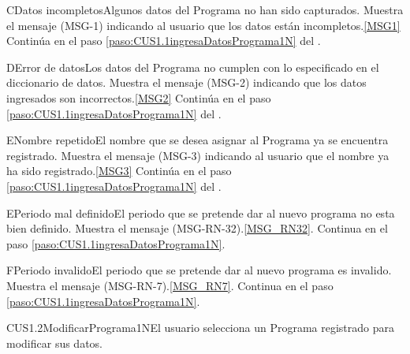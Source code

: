 	\begin{UCtrayectoriaA}{C}{Datos incompletos}{Algunos datos del Programa no han sido capturados.}
			\UCpaso Muestra el mensaje (MSG-1) indicando al usuario que los datos est\'an incompletos.\ref{MSG1}
			\UCpaso Contin\'ua en el paso \ref{paso:CUS1.1ingresaDatosPrograma1N} del .
	\end{UCtrayectoriaA}
		
	\begin{UCtrayectoriaA}{D}{Error de datos}{Los datos del Programa no cumplen con lo especificado en el diccionario de datos.}
			\UCpaso Muestra el mensaje (MSG-2) indicando que los datos ingresados son incorrectos.\ref{MSG2}
			\UCpaso Contin\'ua en el paso \ref{paso:CUS1.1ingresaDatosPrograma1N} del .
	\end{UCtrayectoriaA}

	\begin{UCtrayectoriaA}{E}{Nombre repetido}{El nombre que se desea asignar al Programa ya se encuentra registrado.}
			\UCpaso Muestra el mensaje (MSG-3) indicando al usuario que el nombre ya ha sido registrado.\ref{MSG3}
			\UCpaso Contin\'ua en el paso \ref{paso:CUS1.1ingresaDatosPrograma1N} del .
	\end{UCtrayectoriaA}

\begin{UCtrayectoriaA}{E}{Periodo mal definido}{El periodo que se pretende dar al nuevo programa no esta bien definido.}
		\UCpaso Muestra el mensaje (MSG-RN-32).\ref{MSG_RN32}.
		\UCpaso Continua en el paso \ref{paso:CUS1.1ingresaDatosPrograma1N}.
	\end{UCtrayectoriaA}

	\begin{UCtrayectoriaA}{F}{Periodo invalido}{El periodo que se pretende dar al nuevo programa es invalido.}
		\UCpaso Muestra el mensaje (MSG-RN-7).\ref{MSG_RN7}.
		\UCpaso Continua en el paso \ref{paso:CUS1.1ingresaDatosPrograma1N}.
	\end{UCtrayectoriaA}

	\begin{UseCase}{CUS1.2}{ModificarPrograma1N}{El usuario selecciona un Programa registrado para modificar sus datos.}
	\end{UseCase}

